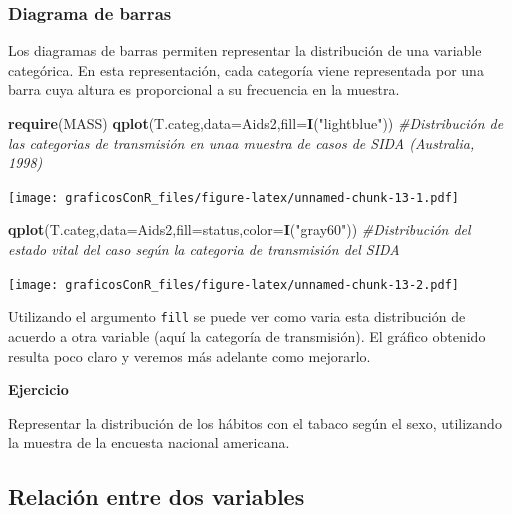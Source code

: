 \documentclass[]{article}
\newenvironment{Shaded}{\begin{snugshade}}{\end{snugshade}}
\newcommand{\CommentTok}[1]{\textcolor[rgb]{0.56,0.35,0.01}{\textit{#1}}}
\newcommand{\DataTypeTok}[1]{\textcolor[rgb]{0.13,0.29,0.53}{#1}}
\newcommand{\KeywordTok}[1]{\textcolor[rgb]{0.13,0.29,0.53}{\textbf{#1}}}
\newcommand{\NormalTok}[1]{#1}
\newcommand{\StringTok}[1]{\textcolor[rgb]{0.31,0.60,0.02}{#1}}
\newcounter{ejcnt}[section]
\numberwithin{ejcnt}{section}
\newenvironment{ej}[1][]{%
	\refstepcounter{ejcnt}%
	\par\medskip%
	\noindent%
	\textbf{Ejercicio \theejcnt \;\;}%
	\rmfamily%
}{\medskip}
\begin{document}
\hypertarget{diagrama-de-barras}{%
\subsubsection{Diagrama de barras}\label{diagrama-de-barras}}

Los diagramas de barras permiten representar la distribución de una variable categórica. En esta representación, cada categoría viene representada por una barra cuya altura es proporcional a su frecuencia en la muestra.

\begin{Shaded}
\begin{Highlighting}[]
\KeywordTok{require}\NormalTok{(MASS)}
\KeywordTok{qplot}\NormalTok{(T.categ,}\DataTypeTok{data=}\NormalTok{Aids2,}\DataTypeTok{fill=}\KeywordTok{I}\NormalTok{(}\StringTok{"lightblue"}\NormalTok{)) }\CommentTok{#Distribución de las categorias de transmisión en unaa muestra de casos de SIDA (Australia, 1998)}
\end{Highlighting}
\end{Shaded}

\texttt{[image: graficosConR\_files/figure-latex/unnamed-chunk-13-1.pdf]}

\begin{Shaded}
\begin{Highlighting}[]
\KeywordTok{qplot}\NormalTok{(T.categ,}\DataTypeTok{data=}\NormalTok{Aids2,}\DataTypeTok{fill=}\NormalTok{status,}\DataTypeTok{color=}\KeywordTok{I}\NormalTok{(}\StringTok{"gray60"}\NormalTok{)) }\CommentTok{#Distribución del estado vital del caso según la categoria de transmisión del SIDA}
\end{Highlighting}
\end{Shaded}

\texttt{[image: graficosConR\_files/figure-latex/unnamed-chunk-13-2.pdf]}

Utilizando el argumento \texttt{fill} se puede ver como varia esta distribución de acuerdo a otra variable (aquí la categoría de transmisión). El gráfico obtenido resulta poco claro y veremos más adelante como mejorarlo.

\begin{ej}
Representar la distribución de los hábitos con el tabaco según el sexo,
utilizando la muestra de la encuesta nacional americana.
\end{ej}

\hypertarget{relacion-entre-dos-variables}{%
\subsection{Relación entre dos variables}\label{relacion-entre-dos-variables}}
\end{document}
